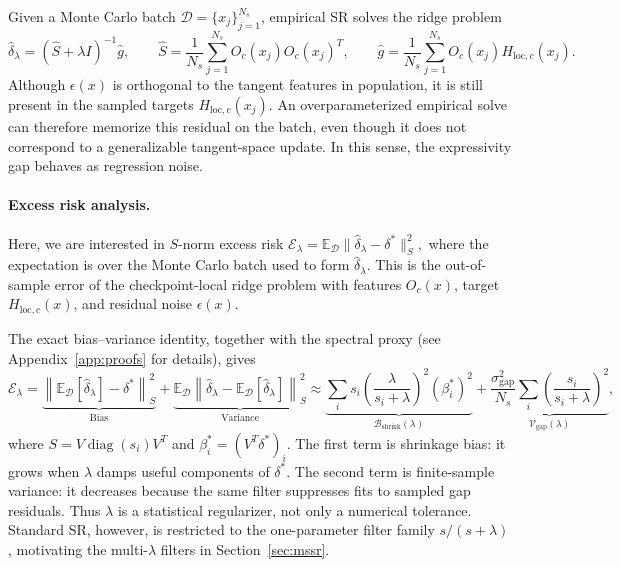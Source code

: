 \documentclass{article}
\newcommand{\Expect}{\mathbb{E}}
\newcommand{\Snorm}[1]{\left\| #1 \right\|_S^2}
\begin{document}
Given a Monte Carlo batch \(\mathcal D=\{x_j\}_{j=1}^{N_s}\), empirical SR solves
the ridge problem
\[
    \hat\delta_\lambda=(\hat S+\lambda I)^{-1}\hat g,
    \qquad
    \hat S=\frac1{N_s}\sum_{j=1}^{N_s}O_c(x_j)O_c(x_j)^T,
    \qquad
    \hat g=\frac1{N_s}\sum_{j=1}^{N_s}O_c(x_j)H_{\mathrm{loc},c}(x_j).
\]
Although \(\epsilon(x)\) is orthogonal to the tangent features in population, it
is still present in the sampled targets \(H_{\mathrm{loc},c}(x_j)\). An
overparameterized empirical solve can therefore memorize this residual on the
batch, even though it does not correspond to a generalizable tangent-space
update. In this sense, the expressivity gap behaves as regression noise.

\paragraph{Excess risk analysis.}
Here, we are interested in \(S\)-norm excess risk
$
    \mathcal E_\lambda
    =
    \Expect_{\mathcal D}
    \|\hat\delta_\lambda-\delta^*\|_S^2,
$
where the expectation is over the Monte Carlo batch used to form
\(\hat\delta_\lambda\). This is the out-of-sample error of the checkpoint-local
ridge problem with features \(O_c(x)\), target \(H_{\mathrm{loc},c}(x)\), and
residual noise \(\epsilon(x)\).

The exact bias--variance identity, together with the spectral proxy (see Appendix~\ref{app:proofs} for details), gives
\begin{equation}\label{eq:spectral_risk}
    \mathcal E_\lambda =
    \underbrace{
    \Snorm{\Expect_{\mathcal D}[\hat\delta_\lambda]-\delta^*}
    }_{\text{Bias}}
    +
    \underbrace{
    \Expect_{\mathcal D}
    \Snorm{\hat\delta_\lambda-\Expect_{\mathcal D}[\hat\delta_\lambda]}
    }_{\text{Variance}}
    \approx
    \underbrace{
    \sum_i
    s_i
    \left(\frac{\lambda}{s_i+\lambda}\right)^2
    (\beta_i^*)^2
    }_{\mathcal B_{\mathrm{shrink}}(\lambda)}
    +
    \underbrace{
    \frac{\sigma_{\mathrm{gap}}^2}{N_s}
    \sum_i
    \left(\frac{s_i}{s_i+\lambda}\right)^2
    }_{\mathcal V_{\mathrm{gap}}(\lambda)} ,
\end{equation}
where \(S=V\operatorname{diag}(s_i)V^T\) and
\(\beta_i^*=(V^T\delta^*)_i\). The first term is shrinkage bias: it grows when
\(\lambda\) damps useful components of \(\delta^*\). The second term is
finite-sample variance: it decreases because the same filter suppresses fits to
sampled gap residuals. Thus \(\lambda\) is a statistical regularizer, not only a
numerical tolerance. Standard SR, however, is restricted to the one-parameter
filter family \(s/(s+\lambda)\), motivating the multi-\(\lambda\) filters in
Section~\ref{sec:mssr}.
\end{document}
